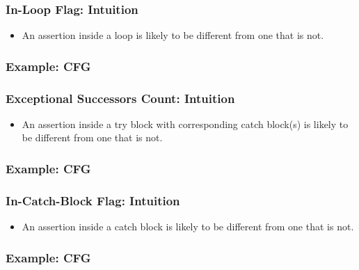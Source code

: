 \documentclass{beamer}
\begin{document}
\begin{frame}
   \frametitle{In-Loop Flag: Intuition} {\Large	
     \begin{itemize}
        \item An assertion inside a loop is likely to be different from one that is not.
     \end{itemize}
	}
\end{frame}

\begin{frame}
  \frametitle{Example: CFG} {
\begin{center}
\scalebox{0.8}{
     
}
\end{center}
	}
\end{frame}

\begin{frame}
   \frametitle{Exceptional Successors Count: Intuition} {\Large	
     \begin{itemize}
        \item An assertion inside a try block with corresponding catch block(s) is likely to be different from one that is not.
     \end{itemize}
	}
\end{frame}

\begin{frame}
  \frametitle{Example: CFG} {
\begin{center}
\scalebox{0.8}{
     
}
\end{center}
	}
\end{frame}

\begin{frame}
   \frametitle{In-Catch-Block Flag: Intuition} {\Large	
     \begin{itemize}
        \item An assertion inside a catch block is likely to be different from one that is not.
     \end{itemize}
	}
\end{frame}

\begin{frame}
  \frametitle{Example: CFG} {
\begin{center}
\scalebox{0.8}{
     
}
\end{center}
	}
\end{frame}
\end{document}

